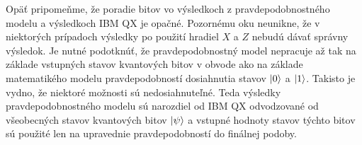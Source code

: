Opäť pripomeňme, že poradie bitov vo výsledkoch z pravdepodobnostného modelu
a výsledkoch IBM QX je opačné. Pozornému oku neunikne, že v niektorých 
prípadoch výsledky po použití hradiel \(X\) a \(Z\) nebudú dávať správny 
výsledok. Je nutné podotknúť, že pravdepodobnostný model nepracuje až tak 
na základe vstupných stavov kvantových bitov v obvode ako na základe
matematikého modelu pravdepodobností dosiahnutia stavov \(\ket{0}\) a 
\(\ket{1}\). Takisto je vydno, že niektoré možnosti sú nedosiahnuteľné.
Teda výsledky pravdepodobnostného modelu sú narozdiel od IBM QX odvodzované od
všeobecných stavov kvantových bitov \(\ket{\psi}\) a vstupné hodnoty stavov
týchto bitov sú použité len na upravednie pravdepodobností do finálnej podoby.
